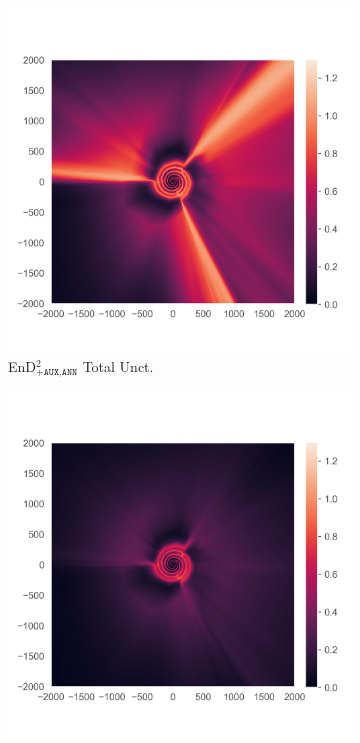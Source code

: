 \begin{figure}
\begin{subfigure}{0.22\textwidth}
  \centering
  \includegraphics[trim=42 45 15 55, clip, width=\linewidth]{plots/3j.png}
  \caption{EnD$^2_{\texttt{+AUX,ANN}}$ Total Unct.}
  \label{fig:3g}
\end{subfigure}%
\begin{subfigure}{0.22\textwidth}
  \centering
  \includegraphics[trim=42 45 15 55, clip, width=\linewidth]{plots/3k.png}

\end{subfigure}
\end{figure}
